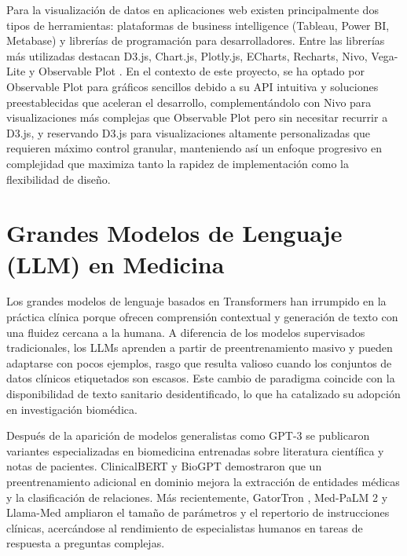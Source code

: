 Para la visualización de datos en aplicaciones web existen principalmente dos tipos de herramientas: plataformas de business intelligence (Tableau, Power BI, Metabase) y librerías de programación para desarrolladores. Entre las librerías más utilizadas destacan D3.js, Chart.js, Plotly.js, ECharts, Recharts, Nivo, Vega-Lite y Observable Plot \cite{Monterail2024_JSViz}. En el contexto de este proyecto, se ha optado por Observable Plot para gráficos sencillos debido a su API intuitiva y soluciones preestablecidas que aceleran el desarrollo, complementándolo con Nivo para visualizaciones más complejas que Observable Plot pero sin necesitar recurrir a D3.js, y reservando D3.js para visualizaciones altamente personalizadas que requieren máximo control granular, manteniendo así un enfoque progresivo en complejidad que maximiza tanto la rapidez de implementación como la flexibilidad de diseño.






\section{Grandes Modelos de Lenguaje (LLM) en Medicina}

Los grandes modelos de lenguaje basados en Transformers han irrumpido en la práctica clínica porque ofrecen comprensión contextual y generación de texto con una fluidez cercana a la humana. A diferencia de los modelos supervisados tradicionales, los LLMs aprenden a partir de preentrenamiento masivo y pueden adaptarse con pocos ejemplos, rasgo que resulta valioso cuando los conjuntos de datos clínicos etiquetados son escasos. Este cambio de paradigma coincide con la disponibilidad de texto sanitario desidentificado, lo que ha catalizado su adopción en investigación biomédica.

Después de la aparición de modelos generalistas como GPT-3 \cite{Brown2020GPT3} se publicaron variantes especializadas en biomedicina entrenadas sobre literatura científica y notas de pacientes. ClinicalBERT \cite{Boag2020_ClinicalBERT} y BioGPT \cite{Lee2020_BioBERT} demostraron que un preentrenamiento adicional en dominio mejora la extracción de entidades médicas y la clasificación de relaciones. Más recientemente, GatorTron \cite{Yang2022_GatorTron}, Med-PaLM 2 \cite{Singhal2023_MedPaLM2} y Llama-Med \cite{Xie2024_MeLLaMA} ampliaron el tamaño de parámetros y el repertorio de instrucciones clínicas, acercándose al rendimiento de especialistas humanos en tareas de respuesta a preguntas complejas.

